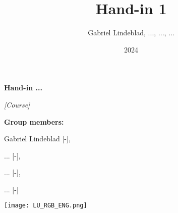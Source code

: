 \documentclass{report}
\title{Hand-in 1}
\author{Gabriel Lindeblad, ..., ..., ...} %
\date{2024} %
\begin{document}
\renewcommand{\contentsname}{Contents}

\begin{titlepage}

    \vspace*{2.5cm}
	\centering
	{\Huge\bfseries Hand-in ...\par}
    \vspace{0.4cm}
    {\large\itshape [Course] \par}
	\vspace{1cm}
	\vfill

	\Large{\bfseries Group members:\par } Gabriel Lindeblad [-], \par ... [-], \par
    ... [-], \par
    ... [-]


    \vspace{1.5cm}
    \texttt{[image: LU\_RGB\_ENG.png]}
    \vspace*{0.5cm}

\end{titlepage}

\newpage


%
\end{document}
